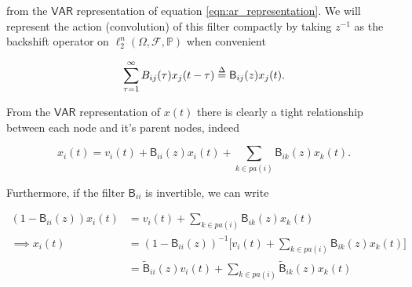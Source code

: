 \documentclass[12pt]{article}
\def\gcg{\mathcal{G}}  %
\def\VAR{\mathsf{VAR}}  %
\def\B{\mathsf{B}}  %
\def\wtB{\widetilde{\B}}  %
\newcommand{\pa}[1]{pa(#1)}  %
\begin{document}
from the $\VAR$ representation of equation
\ref{eqn:ar_representation}.  We will represent the action
(convolution) of this filter compactly by taking $z^{-1}$ as the
backshift operator on $\ell_2^n(\Omega, \mathcal{F}, \mathbb{P})$ when
convenient

\begin{equation}
  \sum_{\tau = 1}^\infty B_{ij}(\tau)x_j(t - \tau) \defeq \B_{ij}(z)x_j(t).
\end{equation}


From the $\VAR$ representation of $x(t)$ there is clearly a tight
relationship between each node and it's parent nodes, indeed

\begin{equation}
  \label{eqn:parent_expansion}
  x_i(t) = v_i(t) + \B_{ii}(z)x_i(t) + \sum_{k \in \pa{i}}\B_{ik}(z)x_k(t).
\end{equation}

Furthermore, if the filter $\B_{ii}$ is invertible, we can write

\begin{equation*}
  \begin{aligned}
    (1 - \B_{ii}(z))x_i(t) &= v_i(t) + \sum_{k \in \pa{i}}\B_{ik}(z)x_k(t)\\
    \implies x_i(t) &= (1 - \B_{ii}(z))^{-1}\big[v_i(t) + \sum_{k \in \pa{i}}\B_{ik}(z)x_k(t)\big]\\
    &= \wtB_{ii}(z)v_i(t) + \sum_{k \in \pa{i}}\wtB_{ik}(z)x_k(t)
  \end{aligned}
\end{equation*}

\end{document}
